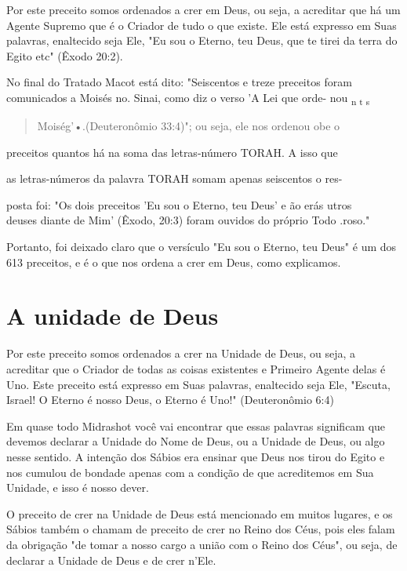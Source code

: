 Por este preceito somos ordenados a crer em Deus, ou seja, a acredi­tar
que há um Agente Supremo que é o Criador de tudo o que existe. Ele está
expresso em Suas palavras, enaltecido seja Ele, "Eu sou o Eterno, teu
Deus, que te tirei da terra do Egito etc" (Êxodo 20:2).

No final do Tratado Macot está dito: "Seiscentos e treze preceitos
foram comunicados a Moisés no. Sinai, como diz o verso 'A Lei que orde-
nou \textsubscript{n t s}

\begin{quote}
Moiség'•.(Deuteronômio 33:4)"; ou seja, ele nos
ordenou obe o
\end{quote}

preceitos quantos há na soma das letras-número TORAH. A isso que

as letras-números da palavra TORAH somam apenas seiscentos o res-

posta foi: "Os dois preceitos 'Eu sou o Eterno, teu Deus' e ão erás
utros\\
deuses diante de Mim' (Êxodo, 20:3) foram ouvidos do próprio Todo
.roso."

Portanto, foi deixado claro que o versículo "Eu sou o Eterno, teu Deus"
é um dos 613 preceitos, e é o que nos ordena a crer em Deus, como
explicamos.

\section{A unidade de Deus}

Por este preceito somos ordenados a crer na Unidade de Deus, ou seja, a
acreditar que o Criador de todas as coisas existentes e Primeiro Agente
delas é Uno. Este preceito está expresso em Suas palavras, enaltecido
seja Ele, "Escuta, Israel! O Eterno é nosso Deus, o Eterno é Uno!"
(Deuteronômio 6:4)

Em quase todo Midrashot você vai encontrar que essas palavras
sig­nificam que devemos declarar a Unidade do Nome de Deus, ou a Unidade
de Deus, ou algo nesse sentido. A intenção dos Sábios era ensinar que
Deus nos tirou do Egito e nos cumulou de bondade apenas com a condição
de que acre­ditemos em Sua Unidade, e isso é nosso dever.

O preceito de crer na Unidade de Deus está mencionado em muitos lugares,
e os Sábios também o chamam de preceito de crer no Reino dos Céus,
pois eles falam da obrigação "de tomar a nosso cargo a união com o Reino
dos Céus", ou seja, de declarar a Unidade de Deus e de crer n'Ele.

